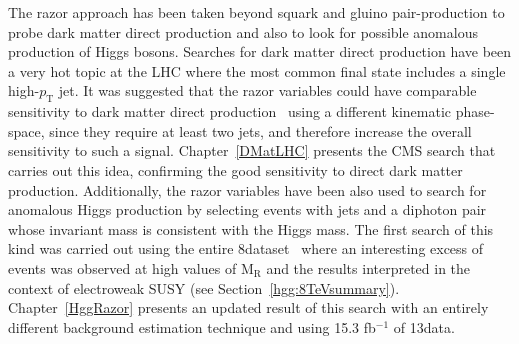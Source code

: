 The razor approach has been taken beyond squark and gluino
pair-production to probe dark matter direct production and also
to look for possible anomalous production of Higgs bosons. Searches for dark matter direct
production have been a very hot topic at the LHC where the most common
final state includes a single high-$p_{\mathrm{T}}$  jet. It was
suggested that the razor variables could have comparable sensitivity
to dark matter direct production~\cite{Fox:2012ee} using a different kinematic
phase-space, since they require at least two jets, and therefore
increase the overall sensitivity to such a signal. Chapter~\ref{DMatLHC}
presents the CMS search that carries out this idea, confirming the
good sensitivity to direct dark matter production. Additionally, the razor
variables have been also used to search for anomalous Higgs production
by selecting events with jets and a diphoton pair whose invariant mass
is consistent with the Higgs mass. The first search of this kind was
carried out using the entire 8\TeV dataset~\cite{SUS-14-017} where an interesting excess
of events was observed at high values of $\mathrm{M_{R}}$ and the
results interpreted in the context of electroweak SUSY (see Section~\ref{hgg:8TeVsummary}). Chapter~\ref{HggRazor}
presents an updated result of this search with an entirely different
background estimation technique and using 15.3 fb$^{-1}$ of 13\TeV data.